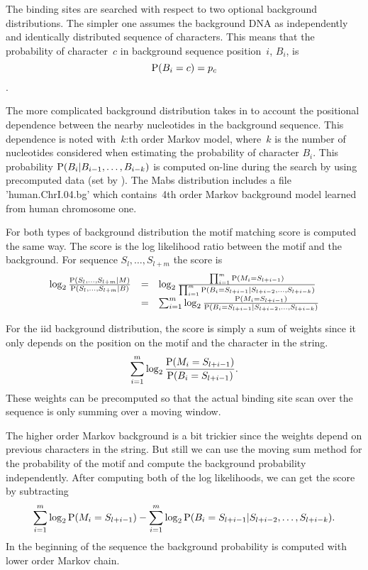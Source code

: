 The binding sites are searched with respect to two optional background
distributions. The simpler one assumes the background DNA as
independently and identically distributed sequence of characters. This
means that the probability of character~$c$ in background sequence
position~$i$, $B_i$, is
\begin{equation}
  \label{eq:bg0markov}
  \mathrm{P}(B_i=c)=p_c
\end{equation}.

The more complicated background distribution takes in to account the
positional dependence between the nearby nucleotides in the background
sequence. This dependence is noted with~$k$:th order Markov model,
where~$k$ is the number of nucleotides considered when estimating the
probability of character $B_i$.  This probability
$\mathrm{P}(B_i|B_{i-1},\ldots,B_{i-k})$ is computed on-line during the
search by using precomputed data (set by ). The
Mabs distribution includes a file 'human.ChrI.04.bg' which
contains~4th order Markov background model learned from human
chromosome one.

For both types of background distribution the motif matching score is
computed the same way. The score is the log likelihood ratio between
the motif and the background. For sequence $S_l,\ldots,S_{l+m}$ the
score is
\begin{equation}
  \label{eq:bsScore}
  \begin{array}{lll}
  \log_2
  \frac{\mathrm{P}(S_l,\ldots,S_{l+m}|M)}{\mathrm{P}(S_l,\ldots,S_{l+m}|B)} &=& \log_2
  \frac{\prod_{i=1}^{m}\mathrm{P}(M_i=S_{l+i-1})}{\prod_{i=1}^m
    \mathrm{P}(B_i=S_{l+i-1}|S_{l+i-2},\ldots,S_{l+i-k}) }\\
   &= &\sum_{i=1}^{m}\log_2
  \frac{\mathrm{P}(M_i=S_{l+i-1})}{
    \mathrm{P}(B_i=S_{l+i-1}|S_{l+i-2},\ldots,S_{l+i-k}) }
  \end{array}
\end{equation}

For the iid background distribution, the score is simply a sum of
weights since it only depends on the position on the motif and the
character in the string.
\begin{equation}
  \label{eq:bg0markovScore}
\sum_{i=1}^m \log_2
  \frac{\mathrm{P}(M_i=S_{l+i-1})}{\mathrm{P}(B_i=S_{l+i-1})}.
\end{equation}
These weights can be precomputed so that the actual binding site scan
over the sequence is only summing over a moving window.

The higher order Markov background is a bit trickier since the weights
depend on previous characters in the string. But still we can use the
moving sum method for the probability of the motif and compute the
background probability independently. After computing both of the log
likelihoods, we can get the score by subtracting
\begin{equation}
  \label{eq:markovCounting}
  \sum_{i=1}^{m}\log_2
  \mathrm{P}(M_i=S_{l+i-1}) -  \sum_{i=1}^{m}\log_2
    \mathrm{P}(B_i=S_{l+i-1}|S_{l+i-2},\ldots,S_{l+i-k}).
\end{equation}
In the beginning of the sequence the background probability is
computed with lower order Markov chain.

